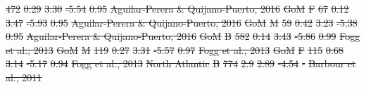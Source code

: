 \documentclass[fleqn,10pt,lineno]{wlpeerj} %
\providecommand{\DIFdel}[1]{{\protect\color{red}\sout{#1}}}                      %
\providecommand{\DIFdelFL}[1]{\DIFdel{#1}} %
\begin{document}
\DIFdelFL{472 }%
\DIFdelFL{0.29 }%
\DIFdelFL{3.30 }%
\DIFdelFL{-5.54 }%
\DIFdelFL{0.95 }%
\DIFdelFL{Aguilar-Perera \& Quijano-Puerto, 2016}%
\DIFdelFL{GoM }%
\DIFdelFL{F }%
\DIFdelFL{67 }%
\DIFdelFL{0.12 }%
\DIFdelFL{3.47 }%
\DIFdelFL{-5.93 }%
\DIFdelFL{0.95 }%
\DIFdelFL{Aguilar-Perera \& Quijano-Puerto, 2016}%
\DIFdelFL{GoM }%
\DIFdelFL{M }%
\DIFdelFL{59 }%
\DIFdelFL{0.42 }%
\DIFdelFL{3.23 }%
\DIFdelFL{-5.38 }%
\DIFdelFL{0.95 }%
\DIFdelFL{Aguilar-Perera \& Quijano-Puerto, 2016}%
\DIFdelFL{GoM }%
\DIFdelFL{B }%
\DIFdelFL{582 }%
\DIFdelFL{0.14 }%
\DIFdelFL{3.43 }%
\DIFdelFL{-5.86 }%
\DIFdelFL{0.99 }%
\DIFdelFL{Fogg et al., 2013}%
\DIFdelFL{GoM }%
\DIFdelFL{M }%
\DIFdelFL{119 }%
\DIFdelFL{0.27 }%
\DIFdelFL{3.31 }%
\DIFdelFL{-5.57 }%
\DIFdelFL{0.97 }%
\DIFdelFL{Fogg et al., 2013}%
\DIFdelFL{GoM }%
\DIFdelFL{F }%
\DIFdelFL{115 }%
\DIFdelFL{0.68 }%
\DIFdelFL{3.14 }%
\DIFdelFL{-5.17 }%
\DIFdelFL{0.94 }%
\DIFdelFL{Fogg et al., 2013}%
\DIFdelFL{North Atlantic }%
\DIFdelFL{B }%
\DIFdelFL{774 }%
\DIFdelFL{2.9 }%
\DIFdelFL{2.89 }%
\DIFdelFL{-4.54 }%
\DIFdelFL{- }%
\DIFdelFL{Barbour et al., 2011}%
\end{document}
